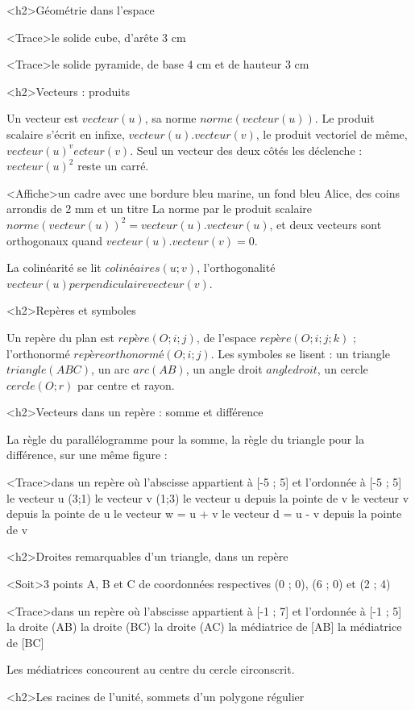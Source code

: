 \documentclass[marges=20, taille=11]{texecole}
\begin{document}
<h2>Géométrie dans l'espace

<Trace>le solide cube, d'arête 3 cm

<Trace>le solide pyramide, de base 4 cm et de hauteur 3 cm

<h2>Vecteurs : produits

Un vecteur est $vecteur(u)$, sa norme $norme(vecteur(u))$. Le produit scalaire s'écrit en infixe, $vecteur(u) . vecteur(v)$, le produit vectoriel de même, $vecteur(u) ^ vecteur(v)$. Seul un vecteur des deux côtés les déclenche : $vecteur(u)^2$ reste un carré.

<Affiche>un cadre avec une bordure bleu marine, un fond bleu Alice, des coins arrondis de 2 mm et un titre {La norme par le produit scalaire} {
	$norme(vecteur(u))^2 = vecteur(u) . vecteur(u)$, et deux vecteurs
	sont orthogonaux quand $vecteur(u) . vecteur(v) = 0$.
}

La colinéarité se lit $colinéaires(u; v)$, l'orthogonalité
$vecteur(u) perpendiculaire vecteur(v)$.

<h2>Repères et symboles

Un repère du plan est $repère(O; i; j)$, de l'espace
$repère(O; i; j; k)$ ; l'orthonormé $repère orthonormé(O; i; j)$. Les symboles se lisent : un triangle $triangle(ABC)$, un arc $arc(AB)$, un angle droit $angle droit$, un cercle $cercle(O; r)$ par centre et rayon.

<h2>Vecteurs dans un repère : somme et différence

La règle du parallélogramme pour la somme, la règle du triangle pour la différence, sur une même figure :

<Trace>dans un repère où l'abscisse appartient à [-5 ; 5] et l'ordonnée à [-5 ; 5] {
	le vecteur u (3;1)
	le vecteur v (1;3)
	le vecteur u depuis la pointe de v
	le vecteur v depuis la pointe de u
	le vecteur w = u + v
	le vecteur d = u - v depuis la pointe de v
}

<h2>Droites remarquables d'un triangle, dans un repère

<Soit>3 points A, B et C de coordonnées respectives (0 ; 0), (6 ; 0) et (2 ; 4)

<Trace>dans un repère où l'abscisse appartient à [-1 ; 7] et l'ordonnée à [-1 ; 5] {
	la droite (AB)
	la droite (BC)
	la droite (AC)
	la médiatrice de [AB]
	la médiatrice de [BC]
}

Les médiatrices concourent au centre du cercle circonscrit.

<h2>Les racines de l'unité, sommets d'un polygone régulier
\end{document}
